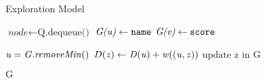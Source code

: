 \documentclass{article}
\begin{document}
\begin{algorithm}
\caption{Exploration Model}\label{graph}
\begin{algorithmic}[2]
		\State $\textit{node} \gets \text{Q.dequeue()}$
		\State $\textit{G(\it{u})} \gets \texttt{name}$
		\State $\textit{G(\it{v})} \gets \texttt{score}$
	\EndIf
\EndWhile\label{euclidendwhile}

	\State $\it{u} = G.removeMin()$
			\State $D(\it{z}) \gets D(\it{u}) + w((\it{u, z}))$
			\State $\text{update z in G}$
		\EndIf
	\EndFor
\EndWhile

\Return $\text{G}$
\EndProcedure
\end{algorithmic}
\end{algorithm}
\end{document}
